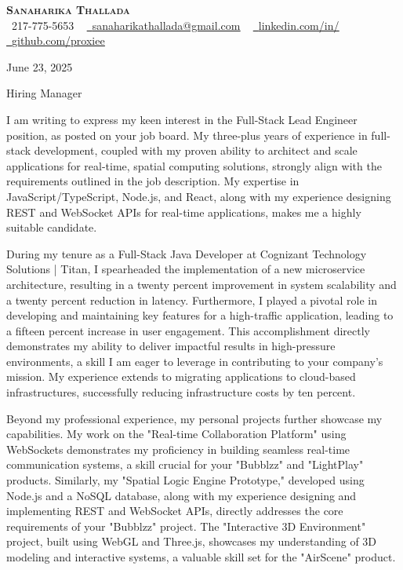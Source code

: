 \documentclass[letterpaper,11pt]{article}
\begin{document}
\begin{center}
    \textbf{\Huge \scshape {\fontsize{15pt}{20pt}\selectfont Sanaharika Thallada}} \\ \vspace{1pt}
    \small \raisebox{-0.1\height}\faPhone\ 217-775-5653 ~ \href{mailto:sanaharikathallada@gmail.com}{\raisebox{-0.2\height}\faEnvelope\  \underline{sanaharikathallada@gmail.com}} ~
    \href{https://www.linkedin.com/in/yashwanthtirupati/}{\raisebox{-0.2\height}\faLinkedin\ \underline{linkedin.com/in/}} ~
    \href{https://github.com/proxiee}{\raisebox{-0.2\height}\faGithub\ \underline{github.com/proxiee}}
\end{center}
\vspace{0.5cm}

June 23, 2025

Hiring Manager


I am writing to express my keen interest in the Full-Stack Lead Engineer position, as posted on your job board.  My three-plus years of experience in full-stack development, coupled with my proven ability to architect and scale applications for real-time, spatial computing solutions, strongly align with the requirements outlined in the job description.  My expertise in JavaScript/TypeScript, Node.js, and React, along with my experience designing REST and WebSocket APIs for real-time applications, makes me a highly suitable candidate.

During my tenure as a Full-Stack Java Developer at Cognizant Technology Solutions | Titan, I spearheaded the implementation of a new microservice architecture, resulting in a twenty percent improvement in system scalability and a twenty percent reduction in latency.  Furthermore, I played a pivotal role in developing and maintaining key features for a high-traffic application, leading to a fifteen percent increase in user engagement.  This accomplishment directly demonstrates my ability to deliver impactful results in high-pressure environments, a skill I am eager to leverage in contributing to your company's mission.  My experience extends to migrating applications to cloud-based infrastructures, successfully reducing infrastructure costs by ten percent.

Beyond my professional experience, my personal projects further showcase my capabilities.  My work on the "Real-time Collaboration Platform" using WebSockets demonstrates my proficiency in building seamless real-time communication systems, a skill crucial for your "Bubblzz" and "LightPlay" products.  Similarly, my "Spatial Logic Engine Prototype," developed using Node.js and a NoSQL database, along with my experience designing and implementing REST and WebSocket APIs, directly addresses the core requirements of your "Bubblzz" project. The "Interactive 3D Environment" project, built using WebGL and Three.js, showcases my understanding of 3D modeling and interactive systems, a valuable skill set for the "AirScene" product.
\end{document}
